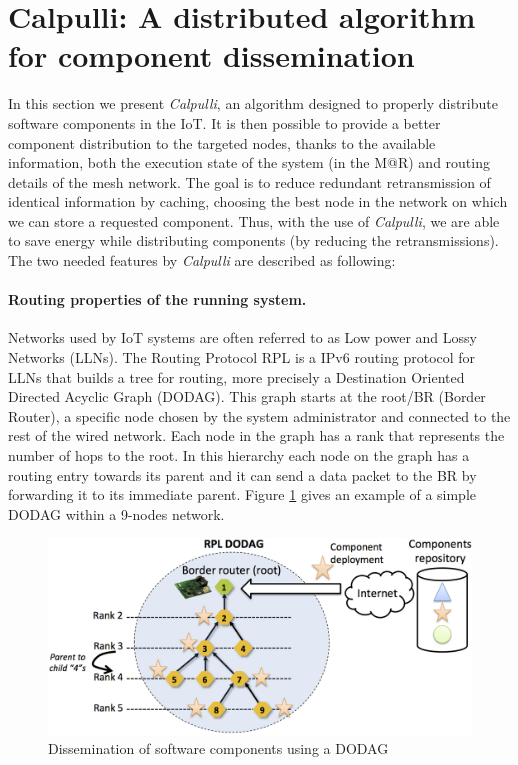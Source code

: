 \section{Calpulli: A distributed algorithm for component dissemination}
In this section we present \textit{Calpulli}, an algorithm designed to properly distribute software components in the IoT.
It is then possible to provide a better component distribution to the targeted nodes, thanks to the available information, both the execution state of the system (in the M@R) and routing details of the mesh network.
The goal is to reduce redundant retransmission of identical information by caching, choosing the best node in the network on which we can store a requested component.
Thus, with the use of \textit{Calpulli}, we are able to save energy while distributing components (by reducing the retransmissions).
The two needed features by \textit{Calpulli} are described as following:
\paragraph{Routing properties of the running system.} Networks used by IoT systems are often referred to as Low power and Lossy Networks (LLNs). The Routing Protocol RPL \cite{rfc6550} is a IPv6 routing protocol for LLNs that builds a tree for routing, more precisely a Destination Oriented Directed Acyclic Graph (DODAG). This graph starts at the root/BR (Border Router), a specific node chosen by the system administrator and connected to the rest of the wired network. Each node in the graph has a rank that represents the number of hops to the root. In this hierarchy each node on the graph has a routing entry towards its parent and it can send a data packet to the BR by forwarding it to its immediate parent. Figure \ref{fig:MARdodag} gives an example of a simple DODAG within a 9-nodes network.

\begin{figure}[htb]
	\centering
	\includegraphics[width=0.98\columnwidth]{chapters/calpulli.images/MAR_dodag.png}
	\caption{Dissemination of software components using a DODAG} \label{fig:MARdodag}
\end{figure}

